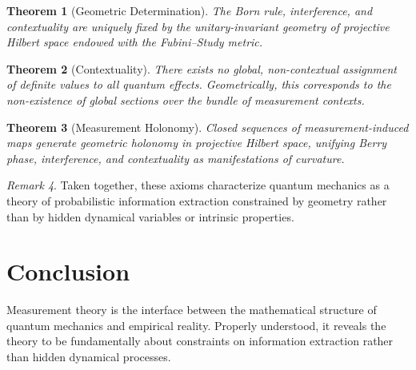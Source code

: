 \documentclass[12pt]{book}
\theoremstyle{plain}
\newtheorem{theorem}{Theorem}[chapter]
\theoremstyle{definition}
\theoremstyle{remark}
\newtheorem{remark}[theorem]{Remark}
\begin{document}
\begin{theorem}[Geometric Determination]
The Born rule, interference, and contextuality are uniquely fixed by the unitary-invariant geometry of projective Hilbert space endowed with the Fubini--Study metric.
\end{theorem}

\begin{theorem}[Contextuality]
There exists no global, non-contextual assignment of definite values to all quantum effects. Geometrically, this corresponds to the non-existence of global sections over the bundle of measurement contexts.
\end{theorem}

\begin{theorem}[Measurement Holonomy]
Closed sequences of measurement-induced maps generate geometric holonomy in projective Hilbert space, unifying Berry phase, interference, and contextuality as manifestations of curvature.
\end{theorem}

\begin{remark}
Taken together, these axioms characterize quantum mechanics as a theory of probabilistic information extraction constrained by geometry rather than by hidden dynamical variables or intrinsic properties.
\end{remark}

\backmatter

\chapter*{Conclusion}
Measurement theory is the interface between the mathematical structure of quantum mechanics and empirical reality. Properly understood, it reveals the theory to be fundamentally about constraints on information extraction rather than hidden dynamical processes.
\end{document}
